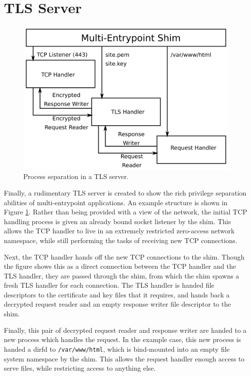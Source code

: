\documentclass[12pt,a4paper,twoside]{report}
\begin{document}
\section{TLS Server}

\begin{figure}
    \centering
    \includegraphics[width=\columnwidth]{figures/tls-server-splitting.png}
    \caption{Process separation in a TLS server.}
    \label{fig:tls-server-splitting}
\end{figure}

Finally, a rudimentary TLS server is created to show the rich privilege separation abilities of multi-entrypoint applications. An example structure is shown in Figure \ref{fig:tls-server-splitting}. Rather than being provided with a view of the network, the initial TCP handling process is given an already bound socket listener by the shim. This allows the TCP handler to live in an extremely restricted zero-access network namespace, while still performing the tasks of receiving new TCP connections.

Next, the TCP handler hands off the new TCP connections to the shim. Though the figure shows this as a direct connection between the TCP handler and the TLS handler, they are passed through the shim, from which the shim spawns a fresh TLS handler for each connection. The TLS handler is handed file descriptors to the certificate and key files that it requires, and hands back a decrypted request reader and an empty response writer file descriptor to the shim.

Finally, this pair of decrypted request reader and response writer are handed to a new process which handles the request. In the example case, this new process is handed a dirfd to \texttt{/var/www/html}, which is bind-mounted into an empty file system namespace by the shim. This allows the request handler enough access to serve files, while restricting access to anything else.
\end{document}
